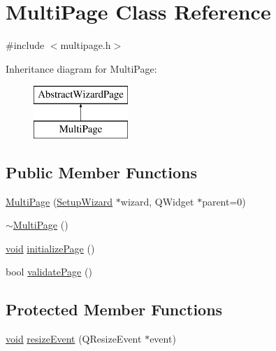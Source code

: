 \hypertarget{class_multi_page}{\section{\-Multi\-Page \-Class \-Reference}
\label{class_multi_page}
}


{\ttfamily \#include $<$multipage.\-h$>$}

\-Inheritance diagram for \-Multi\-Page\-:\begin{figure}[H]
\begin{center}
\leavevmode
\includegraphics[height=2.000000cm]{class_multi_page}
\end{center}
\end{figure}
\subsection*{\-Public \-Member \-Functions}
\begin{DoxyCompactItemize}
\item 
\hyperlink{group___multi_page_ga67a3b947f1068a2da86e80b181056859}{\-Multi\-Page} (\hyperlink{class_setup_wizard}{\-Setup\-Wizard} $\ast$wizard, \-Q\-Widget $\ast$parent=0)
\item 
\hyperlink{group___multi_page_ga6823cea164d1876265dc9606cc878278}{$\sim$\-Multi\-Page} ()
\item 
\hyperlink{group___u_a_v_objects_plugin_ga444cf2ff3f0ecbe028adce838d373f5c}{void} \hyperlink{group___multi_page_gae0380b77afc297043f95c8807031e3dc}{initialize\-Page} ()
\item 
bool \hyperlink{group___multi_page_ga07b9bef6a8d037baebbb6ca9470c6a48}{validate\-Page} ()
\end{DoxyCompactItemize}
\subsection*{\-Protected \-Member \-Functions}
\begin{DoxyCompactItemize}
\item 
\hyperlink{group___u_a_v_objects_plugin_ga444cf2ff3f0ecbe028adce838d373f5c}{void} \hyperlink{group___multi_page_ga29d29742f1cbfe57833315d3d48f9215}{resize\-Event} (\-Q\-Resize\-Event $\ast$event)
\end{DoxyCompactItemize}



